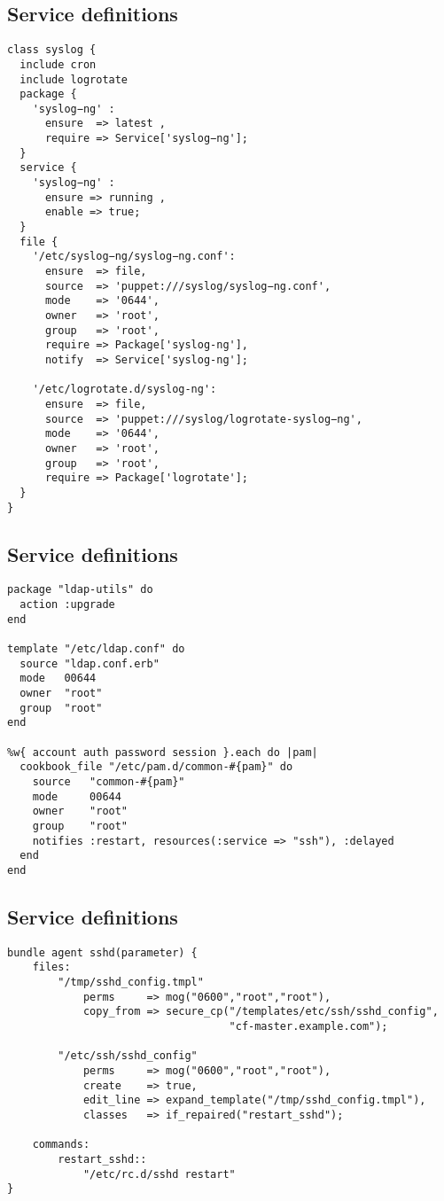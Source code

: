 \documentclass[xga]{xdvislides}
\begin{document}
\subsection{Service definitions}
\small
\begin{verbatim}
class syslog {
  include cron
  include logrotate
  package {
    'syslog−ng' :
      ensure  => latest ,
      require => Service['syslog−ng'];
  }
  service {
    'syslog−ng' :
      ensure => running ,
      enable => true;
  }
  file {
    '/etc/syslog−ng/syslog−ng.conf':
      ensure  => file,
      source  => 'puppet:///syslog/syslog−ng.conf',
      mode    => '0644',
      owner   => 'root',
      group   => 'root',
      require => Package['syslog-ng'],
      notify  => Service['syslog-ng'];

    '/etc/logrotate.d/syslog-ng':
      ensure  => file,
      source  => 'puppet:///syslog/logrotate-syslog−ng',
      mode    => '0644',
      owner   => 'root',
      group   => 'root',
      require => Package['logrotate'];
  }
}
\end{verbatim}
\Normalsize

\subsection{Service definitions}
\smallish
\begin{verbatim}
package "ldap-utils" do
  action :upgrade
end

template "/etc/ldap.conf" do
  source "ldap.conf.erb"
  mode   00644
  owner  "root"
  group  "root"
end

%w{ account auth password session }.each do |pam|
  cookbook_file "/etc/pam.d/common-#{pam}" do
    source   "common-#{pam}"
    mode     00644
    owner    "root"
    group    "root"
    notifies :restart, resources(:service => "ssh"), :delayed
  end
end
\end{verbatim}
\Normalsize

\subsection{Service definitions}
\smallish
\begin{verbatim}
bundle agent sshd(parameter) {
    files:
        "/tmp/sshd_config.tmpl"
            perms     => mog("0600","root","root"),
            copy_from => secure_cp("/templates/etc/ssh/sshd_config",
                                   "cf-master.example.com");

        "/etc/ssh/sshd_config"
            perms     => mog("0600","root","root"),
            create    => true,
            edit_line => expand_template("/tmp/sshd_config.tmpl"),
            classes   => if_repaired("restart_sshd");

    commands:
        restart_sshd::
            "/etc/rc.d/sshd restart"
}
\end{verbatim}
\Normalsize
\end{document}
